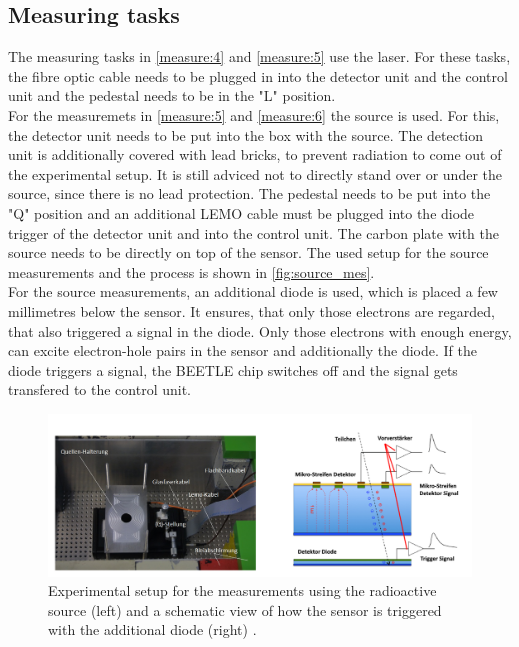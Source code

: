 \subsection{Measuring tasks}

The measuring tasks in \ref{measure:4} and \ref{measure:5} use the laser. For these tasks, the fibre optic cable
needs to be plugged in into the detector unit and the control unit and the pedestal needs to be in the "L" position.\\
For the measuremets in \ref{measure:5} and \ref{measure:6} the source is used. For this, the detector unit needs
to be put into the box with the source. The detection unit is additionally covered with lead bricks, to prevent radiation to come 
out of the experimental setup. It is still adviced not to directly stand over or under the source, since there is no 
lead protection. The pedestal needs to be put into the "Q" position and an additional LEMO cable must be plugged into
the diode trigger of the detector unit and into the control unit. The carbon plate with the source needs to be directly on top
of the sensor. The used setup for the source measurements and the process is shown in \autoref{fig:source_mes}. \\
For the 
source measurements, an additional diode is used, which is placed a few millimetres below the sensor. It ensures, that only
those electrons are regarded, that also triggered a signal in the diode. Only those electrons with enough energy, can excite
electron-hole pairs in the sensor and additionally the diode. If the diode triggers a signal, the BEETLE chip switches off
and the signal gets transfered to the control unit.
\begin{figure}
    \centering
    \includegraphics[width = .8\textwidth]{content/pics/Silicon_Sensor_SOURCE.png}
    \caption{Experimental setup for the measurements using the radioactive source (left) and a schematic view of how the sensor
    is triggered with the additional diode (right) \cite{SiliconStrip}.}
    \label{fig:source_mes}
\end{figure}\\

